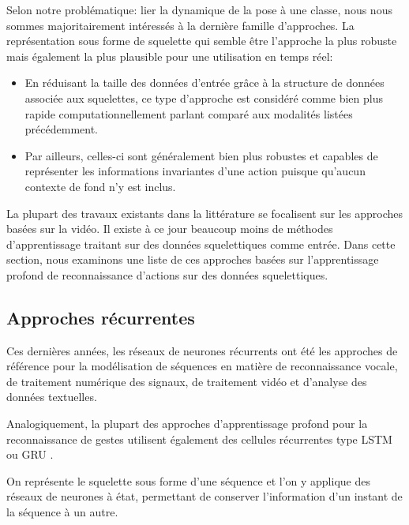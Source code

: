 Selon notre problématique: lier la dynamique de la pose à une classe, nous nous sommes majoritairement intéressés à la dernière famille d'approches. La représentation sous forme de squelette qui semble être l'approche la plus robuste mais également la plus plausible pour une utilisation en temps réel:

\begin{itemize}
    \item En réduisant la taille des données d'entrée grâce à la structure de données associée aux squelettes, ce type d'approche est considéré comme bien plus rapide computationnellement parlant comparé aux modalités listées précédemment.
    \item Par ailleurs, celles-ci sont généralement bien plus robustes et capables de représenter les informations invariantes d'une action puisque qu'aucun contexte de fond n'y est inclus.
\end{itemize}

La plupart des travaux existants dans la littérature se focalisent sur les approches basées sur la vidéo. Il existe à ce jour beaucoup moins de méthodes d'apprentissage traitant sur des données squelettiques comme entrée. Dans cette section, nous examinons une liste de ces approches basées sur l'apprentissage profond de reconnaissance d'actions sur des données squelettiques.

\subsection{Approches récurrentes}

Ces dernières années, les réseaux de neurones récurrents ont  été les approches de référence pour la modélisation de séquences en matière de reconnaissance vocale, de traitement numérique des signaux, de traitement vidéo et d'analyse des données textuelles. 


Analogiquement, la plupart des approches d'apprentissage profond pour la reconnaissance de gestes utilisent également des cellules récurrentes type LSTM\\ \cite{hochreiter1997long} ou GRU \cite{2014arXiv1406.1078C}.

On représente le squelette sous forme d’une séquence et l'on y applique des réseaux de neurones à état, permettant de conserver l’information d’un instant de la séquence à un autre.

